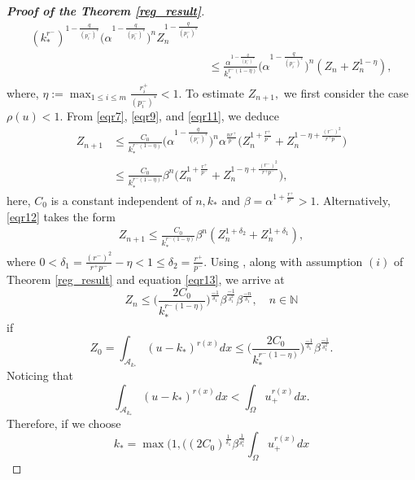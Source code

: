 \documentclass[11pt]{article}
\newcommand{\al} {\alpha}
\newcommand{\om} {\Omega}
\newcommand{\ds} {\displaystyle}
\begin{document}
\begin{proof}[\bf Proof of the Theorem \ref{reg_result}]
\begin{equation}
\begin{aligned}
{  (k_{*}^{r^{-}}
  )^{1-\frac{q}{
  (p_{i}^{-}
  )^{*}}}}
\Big (\al^{1-\frac{q}{
  (p_{i}^{-}
  )^{*}}}
\Big )^{n} Z_{n}^{1-
\frac{q}{
  (p_{i}^{-}
  )^{*}}} \\
&\leq \frac{\al^{1-
\frac{q}{
  (p_{i}^{-}
  )^{*}}}}{k_{*}^{r^{-}(1-\eta)}}
\Big (\al^{1-\frac{q}{
  (p_{i}^{-}
  )^{*}}}
\Big )^{n}
  (Z_{n}+Z_{n}^{1-\eta}
  ),
\end{aligned}
\end{equation}
where, $\eta:=\ds\max_{1\le i\le m} 
\frac{r_i^+}{(p_i^-)^*}<1.$
To estimate $Z_{n+1},$
we first consider the case $\rho(u)<1.$
From \eqref{eqr7}, \eqref{eqr9}, and \eqref{eqr11},
 we deduce
\begin{align}\label{eqr12}
    Z_{n+1}&\le 
\frac{C_0}{k_{*}^{r^{-}(1-\eta)}}
\Big (\al^{1-
\frac{q}{
  (p_{i}^{-}
  )^{*}}}
\Big )^{n}\al^{
\frac{nr^+}{p^-}}
\Big (Z_{n}^{1+
\frac{r^+}{p^-}}+Z_{n}^{1-\eta+
\frac{(r^-)^2}{r^+p^-}}
\Big )\nonumber\\
    &\le 
\frac{C_0}{k_{*}^{r^{-}(1-\eta)}}\beta^{n}
\Big (Z_{n}^{1+
\frac{r^+}{p^-}}+Z_{n}^{1-\eta+
\frac{(r^-)^2}{r^+p^-}}
\Big ),
\end{align}
here, $C_0$
is a constant independent of $n,k_*$
and $\beta=\al^{1+
\frac{r^+}{p^-}}>1.$
Alternatively, \eqref{eqr12} takes the form
\begin{align}\label{eqr13}
    Z_{n+1}\le 
\frac{C_0}{k_{*}^{r^{-}(1-\eta)}}\beta^{n}
\left (Z_{n}^{1+\delta_2}+Z_{n}^{1+\delta_1}
\right ),
\end{align}
where $0<\delta_1=
\frac{(r^-)^2}{r^+p^-}-\eta<1\le\delta_2=
\frac{r^+}{p^-}.$
Using
\cite[Lemma 4.3]{KuHo3}, along with 
assumption $(i)$
of Theorem \ref{reg_result} and equation 
\eqref{eqr13}, we arrive at
\begin{equation}\label{eqr14}
Z_{n} \leq
\Big (
\frac{2 C_0}{k_{*}^{r^{-}(1-\eta)}}
\Big )^{
\frac{-1}{\delta_{1}}} \beta^{
\frac{-1}{\delta_{1}^{2}}} \beta^{
\frac{-n}{\delta_{1}}}, \quad n \in \mathbb{N}
\end{equation}
if
\begin{equation}\label{eqr15}
Z_{0}=
\int_{\mathcal{A}_{k_*}}
  (u-k_{*}
  )^{r(x)} d x \leq
\Big (
\frac{2 C_0}{k_{*}^{r^{-}(1-\eta)}}
\Big )^{
\frac{-1}{\delta_{1}}} \beta^{
\frac{-1}{\delta_{1}^{2}}}.
\end{equation}
Noticing that 
$$
\ds
\int_{\mathcal{A}_{k_{*}}}
\left (u-k_{*}
\right )^{r(x)} dx<\ds
\int_{\om}u_+^{r(x)} dx.
$$
Therefore, if we choose
$$
k_{*}=\max 
\Big (1,
\Big (
  (2 C_0 )^{
\frac{1}{\delta_{1}}} \beta^{
\frac{1}{\delta_{1}^{2}}} 
\int_{\Omega} u_{+}^{r(x)} d x
$$
\end{proof}
\end{document}

